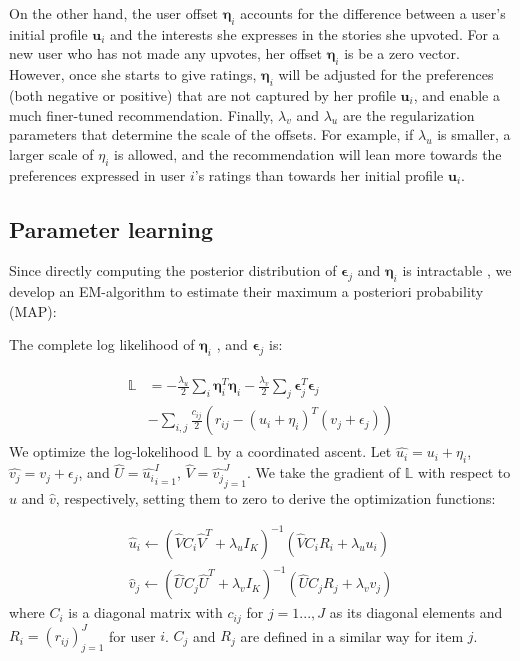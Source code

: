 \documentclass[conference]{IEEEtran}
\begin{document}
On the other hand, the user offset $\mathbf{\eta}_i$ accounts for the difference between a user's initial profile $\mathbf{u}_i$ and the interests she expresses in the stories she upvoted. For a new user who has not made any upvotes, her offset $\mathbf{\eta}_i$ is be a zero vector. However, once she starts to give ratings, $\mathbf{\eta}_i$ will be adjusted for the preferences (both negative or positive) that are not captured by her profile $\mathbf{u}_i$, and enable a much finer-tuned recommendation. Finally, $\lambda_v$ and $\lambda_u$ are the regularization parameters that determine the scale of the offsets. For example, if $\lambda_u$ is smaller, a larger scale of $\eta_i$ is allowed, and the recommendation will lean more towards the preferences expressed in user $i$'s ratings than towards her initial profile $\mathbf{u}_i$.

\subsection{Parameter learning}
Since directly computing the posterior distribution of $\mathbf{\epsilon}_j$ and $\mathbf{\eta}_i$ is intractable \cite{wang2011collaborative}, we develop an EM-algorithm \cite{dempster1977maximum} to estimate their maximum a posteriori probability (MAP):

The complete log likelihood of $\mathbf{\eta}_i$ , and $\mathbf{\epsilon}_j$ is: 

\begin{eqnarray}
\begin{split}
\mathbb{L} &= - \frac{\lambda_{u}}{2}\sum_{i}\mathbf{\eta}_i^{T}\mathbf{\eta}_i 
             - \frac{\lambda_{v}}{2}\sum_{j}\mathbf{\epsilon}_j^{T}\mathbf{\epsilon}_j \\
        &     - \sum_{i,j}\frac{c_{ij}}{2}(r_{ij}-(u_i+\eta_i)^T(v_j+\epsilon_j))
\end{split}
\end{eqnarray}
We optimize the log-lokelihood $\mathbb{L}$ by a coordinated ascent. Let $\hat{u_i}=u_i+\eta_i$, $\hat{v_j}=v_j+\epsilon_j$, and  $\hat{U}=\hat{u_i}^I_{i=1}$, $\hat{V}=\hat{v_j}^J_{j=1}$. We take the gradient of $\mathbb{L}$ with respect to $\hat{u}$ and $\hat{v}$, respectively, setting them to zero to derive the optimization functions:

\begin{eqnarray}\label{eq:gradient_u}
\hat{u}_i \leftarrow (\hat{V}C_i\hat{V}^T + \lambda_uI_K)^{-1}(\hat{V}C_iR_i + \lambda_uu_i)\\
\label{eq:gradient_v}
\hat{v}_j \leftarrow (\hat{U}C_j\hat{U}^T + \lambda_vI_K)^{-1}(\hat{U}C_jR_j + \lambda_vv_j)
\end{eqnarray} where $C_i$ is a diagonal matrix with $c_{ij}$ for $j=1 ..., J$ as its diagonal elements and $R_i = (r_{ij})^J_{j=1}$ for user $i$. $C_j$ and $R_j$ are defined in a similar way for item $j$. 
\end{document}
